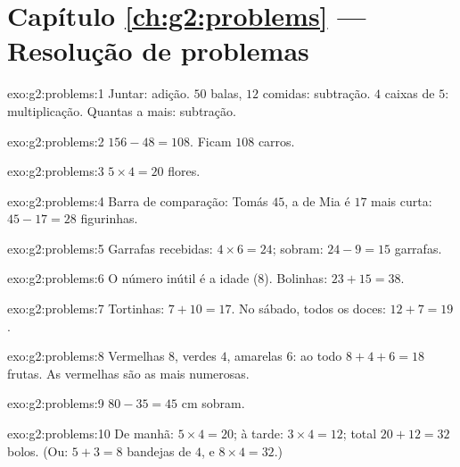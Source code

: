 \section*{Capítulo \ref{ch:g2:problems} --- Resolução de problemas}

\begin{solution}{exo:g2:problems:1}
Juntar: adição. $50$ balas, $12$ comidas: subtração. $4$ caixas de
$5$: multiplicação. Quantas a mais: subtração.
\end{solution}

\begin{solution}{exo:g2:problems:2}
$156 - 48 = 108$. Ficam $108$ carros.
\end{solution}

\begin{solution}{exo:g2:problems:3}
$5 \times 4 = 20$ flores.
\end{solution}

\begin{solution}{exo:g2:problems:4}
Barra de comparação: Tomás $45$, a de Mia é $17$ mais curta:
$45 - 17 = 28$ figurinhas.
\end{solution}

\begin{solution}{exo:g2:problems:5}
Garrafas recebidas: $4 \times 6 = 24$; sobram: $24 - 9 = 15$
garrafas.
\end{solution}

\begin{solution}{exo:g2:problems:6}
O número inútil é a idade ($8$). Bolinhas: $23 + 15 = 38$.
\end{solution}

\begin{solution}{exo:g2:problems:7}
Tortinhas: $7 + 10 = 17$. No sábado, todos os doces:
$12 + 7 = 19$.
\end{solution}

\begin{solution}{exo:g2:problems:8}
Vermelhas $8$, verdes $4$, amarelas $6$: ao todo $8 + 4 + 6 = 18$
frutas. As vermelhas são as mais numerosas.
\end{solution}

\begin{solution}{exo:g2:problems:9}
$80 - 35 = 45$ cm sobram.
\end{solution}

\begin{solution}{exo:g2:problems:10}
De manhã: $5 \times 4 = 20$; à tarde: $3 \times 4 = 12$; total
$20 + 12 = 32$ bolos. (Ou: $5 + 3 = 8$ bandejas de $4$, e
$8 \times 4 = 32$.)
\end{solution}
